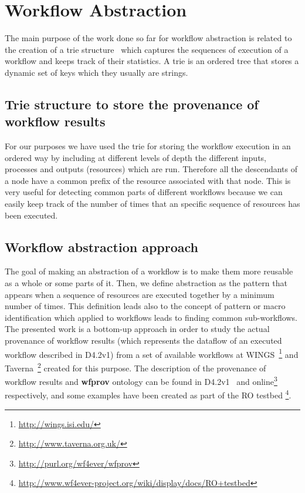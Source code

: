 \section{Workflow Abstraction}

\label{sec:abstraction}
The main purpose of the work done so far for workflow abstraction is related to the creation of a trie structure~\cite{knuth11} which captures the sequences of execution of a workflow and keeps track of their statistics. A trie is an ordered tree that stores a dynamic set of keys which they usually are strings. 

\subsection{Trie structure to store the provenance of workflow results}
For our purposes we have used the trie for storing the workflow execution in an ordered way by including at different levels of depth the different inputs, processes and outputs (resources) which are run. Therefore all the descendants of a node have a common prefix of the resource associated with that node. This is very useful for detecting common parts of different workflows because we can easily keep track of the number of times that an specific sequence of resources has been executed. \\

\subsection{Workflow abstraction approach}
The goal of making an abstraction of a workflow is to make them more reusable as a whole or some parts of it. Then, we define abstraction as the pattern that appears when a sequence of resources are executed together by a minimum number of times. This definition leads also to the concept of pattern or macro identification which applied to workflows leads to finding common sub-workflows. \\ 

The presented work is a bottom-up approach in order to study the actual provenance of workflow results (which represents the dataflow of an executed workflow described in D4.2v1) from a set of available workflows at WINGS~\footnote{\url{http://wings.isi.edu/}} and Taverna~\footnote{\url{http://www.taverna.org.uk/}} created for this purpose. The description of the provenance of workflow results and \textbf{wfprov} ontology can be found in D4.2v1~\cite{D4.2v1} and online\footnote{\url{http://purl.org/wf4ever/wfprov}} respectively, and some  examples have been created as part of the RO testbed \footnote{\url{http://www.wf4ever-project.org/wiki/display/docs/RO+testbed}}. \\

